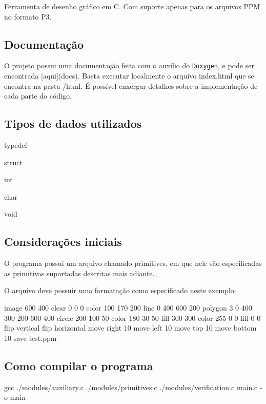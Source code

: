 Ferramenta de desenho gráfico em C. Com suporte apenas para os arquivos P\+PM no formato P3.

\subsection*{Documentação}

O projeto possui uma documentação feita com o auxílio do \href{http://www.doxygen.nl/}{\tt Doxygen}, e pode ser encontrada \mbox{[}aqui\mbox{]}(docs). Basta executar localmente o arquivo {\ttfamily index.\+html} que se encontra na pasta {\ttfamily /html}. É possível enxergar detalhes sobre a implementação de cada parte do código.

\subsection*{Tipos de dados utilizados}


\begin{DoxyItemize}
\item typedef
\item struct
\item int
\item char
\item void
\end{DoxyItemize}

\subsection*{Considerações iniciais}

O programa possui um arquivo chamado {\ttfamily primitives}, em que nele são especificadas as primitivas suportadas descritas mais adiante.

O arquivo deve possuir uma formatação como específicado neste exemplo\+: 
\begin{DoxyCode}
image 600 400
clear 0 0 0
color 100 170 200
line 0 400 600 200
polygon 3 0 400 300 200 600 400
circle 200 100 50
color 180 30 50
fill 300 300
color 255 0 0
fill 0 0
flip vertical
flip horizontal
move right 10
move left 10
move top 10
move bottom 10
save test.ppm
\end{DoxyCode}


\subsection*{Como compilar o programa}


\begin{DoxyCode}
gcc ./modules/auxiliary.c ./modules/primitives.c ./modules/verification.c main.c -o main
\end{DoxyCode}


